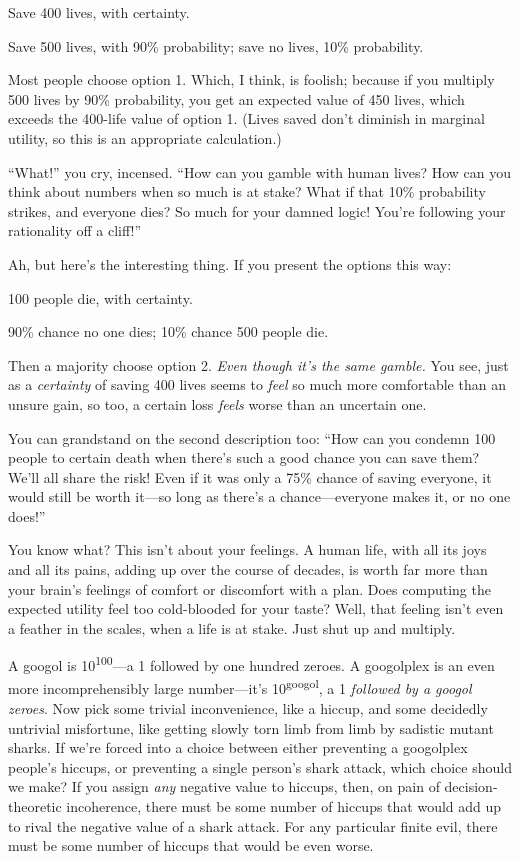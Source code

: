 {
 Save 400 lives, with certainty.}

{
 Save 500 lives, with 90\% probability; save no lives, 10\%
probability.}

{
 Most people choose option 1. Which, I think, is foolish; because
if you multiply 500 lives by 90\% probability, you get an expected
value of 450 lives, which exceeds the 400-life value of option 1.
(Lives saved don't diminish in marginal utility, so
this is an appropriate calculation.)}

{
 ``What!'' you cry, incensed.
``How can you gamble with human lives? How can you
think about numbers when so much is at stake? What if that 10\%
probability strikes, and everyone dies? So much for your damned logic!
You're following your rationality off a
cliff!''}

{
 Ah, but here's the interesting thing. If you
present the options this way:}

{
 100 people die, with certainty.}

{
 90\% chance no one dies; 10\% chance 500 people die.}

{
 Then a majority choose option 2. \textit{Even though
it's the same gamble.} You see, just as a
\textit{certainty} of saving 400 lives seems to \textit{feel} so much
more comfortable than an unsure gain, so too, a certain loss
\textit{feels} worse than an uncertain one.}

{
 You can grandstand on the second description too:
``How can you condemn 100 people to certain death when
there's such a good chance you can save them?
We'll all share the risk! Even if it was only a 75\%
chance of saving everyone, it would still be worth it---so long as
there's a chance---everyone makes it, or no one
does!''}

{
 You know what? This isn't about your feelings. A
human life, with all its joys and all its pains, adding up over the
course of decades, is worth far more than your brain's
feelings of comfort or discomfort with a plan. Does computing the
expected utility feel too cold-blooded for your taste? Well, that
feeling isn't even a feather in the scales, when a life
is at stake. Just shut up and multiply.}

{
 A googol is 10\textsuperscript{100}{}---a 1 followed by one
hundred zeroes. A googolplex is an even more incomprehensibly large
number---it's 10\textsuperscript{googol}, a 1
\textit{followed by a googol zeroes}. Now pick some trivial
inconvenience, like a hiccup, and some decidedly untrivial misfortune,
like getting slowly torn limb from limb by sadistic mutant sharks. If
we're forced into a choice between either preventing a
googolplex people's hiccups, or preventing a single
person's shark attack, which choice should we make? If
you assign \textit{any} negative value to hiccups, then, on pain of
decision-theoretic incoherence, there must be some number of hiccups
that would add up to rival the negative value of a shark attack. For
any particular finite evil, there must be some number of hiccups that
would be even worse.}

